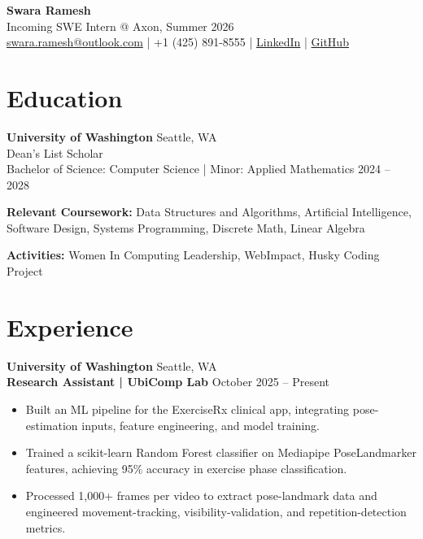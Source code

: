 \documentclass[11pt]{article}
\begin{document}
\begin{center}
    {\LARGE \textbf{Swara Ramesh}} \\
    Incoming SWE Intern @ Axon, Summer 2026 \\
    \href{mailto:swara.ramesh@outlook.com}{swara.ramesh@outlook.com} \;|\;
    +1 (425) 891-8555 \;|\;
    \href{https://www.linkedin.com/}{LinkedIn} \;|\;
    \href{https://github.com/}{GitHub}
\end{center}

\vspace{0.2in}

\section*{Education}

\textbf{University of Washington} \hfill Seattle, WA \\
Dean’s List Scholar \\
Bachelor of Science: Computer Science \;|\; Minor: Applied Mathematics \hfill 2024 -- 2028

\vspace{0.05in}
\textbf{Relevant Coursework:} Data Structures and Algorithms, Artificial Intelligence, Software Design, Systems Programming, Discrete Math, Linear Algebra

\textbf{Activities:} Women In Computing Leadership, WebImpact, Husky Coding Project

\vspace{0.15in}

\section*{Experience}

\textbf{University of Washington} \hfill Seattle, WA \\

\textbf{Research Assistant | UbiComp Lab} \hfill October 2025 -- Present
\begin{itemize}
    \item Built an ML pipeline for the ExerciseRx clinical app, integrating pose-estimation inputs, feature engineering, and model training.
    \item Trained a scikit-learn Random Forest classifier on Mediapipe PoseLandmarker features, achieving 95\% accuracy in exercise phase classification.
    \item Processed 1,000+ frames per video to extract pose-landmark data and engineered movement-tracking, visibility-validation, and repetition-detection metrics.
\end{itemize}
\end{document}
